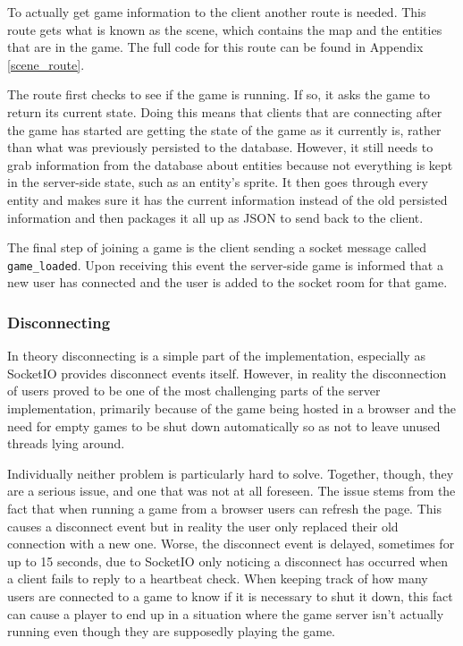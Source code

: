 To actually get game information to the client another route is needed. This route gets what is known as the scene, which contains the map and the entities that are in the game. The full code for this route can be found in Appendix \ref{scene_route}.

The route first checks to see if the game is running. If so, it asks the game to return its current state. Doing this means that clients that are connecting after the game has started are getting the state of the game as it currently is, rather than what was previously persisted to the database. However, it still needs to grab information from the database about entities because not everything is kept in the server-side state, such as an entity's sprite. It then goes through every entity and makes sure it has the current information instead of the old persisted information and then packages it all up as JSON to send back to the client.

The final step of joining a game is the client sending a socket message called \texttt{game\_loaded}. Upon receiving this event the server-side game is informed that a new user has connected and the user is added to the socket room for that game.

\subsubsection{Disconnecting}\label{disconnecting}
In theory disconnecting is a simple part of the implementation, especially as SocketIO provides disconnect events itself. However, in reality the disconnection of users proved to be one of the most challenging parts of the server implementation, primarily because of the game being hosted in a browser and the need for empty games to be shut down automatically so as not to leave unused threads lying around.

Individually neither problem is particularly hard to solve. Together, though, they are a serious issue, and one that was not at all foreseen. The issue stems from the fact that when running a game from a browser users can refresh the page. This causes a disconnect event but in reality the user only replaced their old connection with a new one. Worse, the disconnect event is delayed, sometimes for up to 15 seconds, due to SocketIO only noticing a disconnect has occurred when a client fails to reply to a heartbeat check. When keeping track of how many users are connected to a game to know if it is necessary to shut it down, this fact can cause a player to end up in a situation where the game server isn't actually running even though they are supposedly playing the game.


